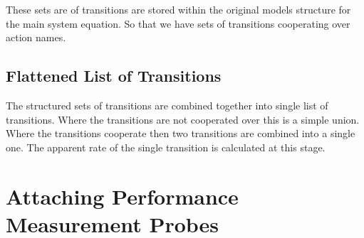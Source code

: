 These sets are of transitions are stored within the original models structure
for the main system equation. So that we have sets of transitions cooperating
over action names.

\subsection{Flattened List of Transitions}
The structured sets of transitions are combined together into single list
of transitions. Where the transitions are not cooperated over this is a simple
union. Where the transitions cooperate then two transitions are combined into a
single one. The apparent rate of the single transition is calculated at this
stage.

\else
\fi


\section{Attaching Performance Measurement Probes}
